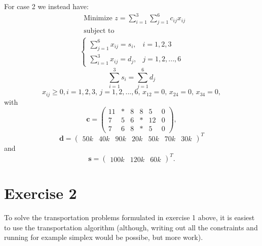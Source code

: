 \documentclass{article}
\begin{document}
  \noindent
  For case 2 we instead have:
   \begin{align*}
  & \text{Minimize } z = \sum_{i=1}^{3}\sum_{j=1}^6 c_{ij}x_{ij} \\
  & \text{subject to}
    \label{eq17}
  \end{align*}
  \begin{align*}
    \begin{cases}
      \sum_{j=1}^{6} x_{ij} = s_{i}, & i = 1, 2, 3 \\
      \sum_{i=1}^{3} x_{ij} = d_{j}, & j = 1, 2, ..., 6
    \end{cases}
  \end{align*}
  \begin{equation*}
    \sum_{i=1}^{3} s_{i} = \sum_{j=1}^6 d_{j}
    \label{eq19}
  \end{equation*}
  \begin{equation*}
    x_{ij} \geq 0, i = 1, 2, 3,\, j = 1, 2, ..., 6,\, x_{12} = 0,\, x_{24} = 0,\, x_{34} = 0,
    \label{eq20}
  \end{equation*}
  with
  \begin{equation*}
    \mathbf{c} = 
    \begin{pmatrix}
      11 & * & 8 & 8  & 5  & 0\\
      7  & 5 & 6 & *  & 12 & 0\\
      7  & 6 & 8 & *  & 5  & 0
    \end{pmatrix},
    \label{eq21}
  \end{equation*}
  \begin{equation*}
    \mathbf{d} =
    \begin{pmatrix}
      50k & 40k & 90k & 20k & 50k & 70k & 30k
    \end{pmatrix}^T
    \label{eq22}
  \end{equation*}
  and
  \begin{equation*}
    \mathbf{s} =
    \begin{pmatrix}
      100k & 120k & 60k
    \end{pmatrix}^T.
    \label{eq23}
  \end{equation*}

  \section*{Exercise 2}
  To solve the transportation problems formulated in exercise 1 above, it is easiest to use the transportation algorithm (although, writing out all the constraints and running for example simplex would be possibe, but more work).
\end{document}
